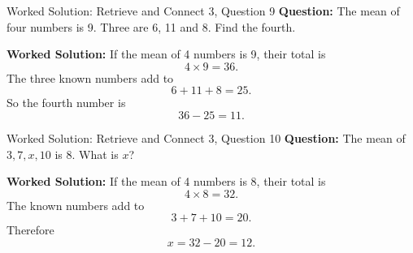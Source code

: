 \documentclass{beamer}
\begin{document}
\begin{frame}{Worked Solution: Retrieve and Connect 3, Question 9}
\textbf{Question:} The mean of four numbers is 9. Three are 6, 11 and 8. Find the fourth.

\textbf{Worked Solution:}
If the mean of 4 numbers is 9, their total is
\[
4 \times 9 = 36.
\]
The three known numbers add to
\[
6 + 11 + 8 = 25.
\]
So the fourth number is
\[
36 - 25 = 11.
\]
\end{frame}

\begin{frame}{Worked Solution: Retrieve and Connect 3, Question 10}
\textbf{Question:} The mean of \(3, 7, x, 10\) is \(8\). What is \(x\)?

\textbf{Worked Solution:}
If the mean of 4 numbers is 8, their total is
\[
4 \times 8 = 32.
\]
The known numbers add to
\[
3 + 7 + 10 = 20.
\]
Therefore
\[
x = 32 - 20 = 12.
\]
\end{frame}
\end{document}
